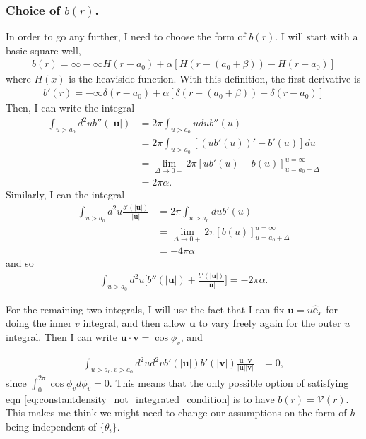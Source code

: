 \documentclass{article}
\begin{document}
\subsubsection{Choice of $b(r)$.}

In order to go any further, I need to choose the form of $b(r)$. I will start with a basic square
well,
\begin{align}
  b(r) =\infty-\infty H(r-a_0)+\alpha[H(r-(a_0+\beta))-H(r-a_0)]
\end{align}
where $H(x)$ is the heaviside function. 
With this definition, the first derivative is
\begin{align}
  b'(r) = -\infty\delta(r-a_0)+\alpha[\delta(r-(a_0+\beta))-\delta(r-a_0)]
\end{align}
Then, I can write the integral
\begin{align}
  \int_{u>a_0} d^2ub''(|\bm{u}|)
  &= 2\pi\int_{u>a_0} udub''(u)\nonumber\\
  &=2\pi \int_{u>a_0} [(ub'(u))'-b'(u)]du\nonumber\\
  &=\lim_{\Delta\to0+}2\pi[ub'(u)-b(u)]_{u=a_0+\Delta}^{u=\infty}\nonumber\\
  &=2\pi\alpha.
\end{align}
Similarly, I can the integral
\begin{align}
  \int_{u>a_0} d^2u\frac{b'(|\bm{u}|)}{|\bm{u}|}
  &=2\pi\int_{u>a_0} dub'(u)\nonumber\\
  &=\lim_{\Delta\to0+}2\pi[b(u)]_{u=a_0+\Delta}^{u=\infty}\nonumber\\
  &=-4\pi\alpha
\end{align}
and so
\begin{align}
  \int_{u>a_0} d^2u\bigg[b''(|\bm{u}|)+\frac{b'(|\bm{u}|)}{|\bm{u}|}\bigg]
  = -2\pi\alpha.
\end{align}

For the remaining two integrals, I will use the fact that I can fix $\bm{u}=u \hat{\bm{e}}_x$
for doing the inner $v$ integral, and then allow $\bm{u}$ to vary freely again for the outer
$u$ integral. Then I can write $\bm{u}\cdot\bm{v}=\cos\phi_v$, and 

\begin{align}
  \int_{u>a_0,v>a_0} d^2ud^2vb'(|\bm{u}|)b'(|\bm{v}|)
  \frac{\bm{u}\cdot\bm{v}}{|\bm{u}||\bm{v}|}
  &=0,
\end{align}
since $\int_0^{2\pi} \cos\phi_v d\phi_v=0$. This means that the only possible option of satisfying
eqn \ref{eq:constantdensity_not_integrated_condition} is to have $b(r)=\mathcal{V}(r)$. This makes
me think we might need to change our assumptions on the form of $h$ being independent of
$\{\theta_i\}$.
\end{document}
